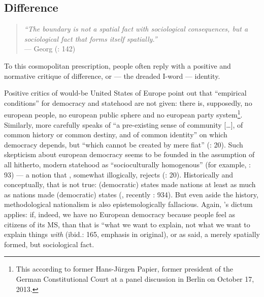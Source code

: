 \subsection[Difference]{Difference} \label{sec:ID-Difference}

\begin{quote}
	\emph{``The boundary is not a spatial fact with sociological consequences, but a sociological fact that forms itself spatially.''} \\
	--- Georg \citeauthor{Simmel1903} (\citeyear{Simmel1903}: 142)
\end{quote}

To this cosmopolitan prescription, people often reply with a positive and normative critique of difference, or --- the dreaded I-word --- identity.

Positive critics of would-be United States of Europe point out that ``empirical conditions'' for democracy and statehood are not given: there is, supposedly, no european people, no european public sphere and no european party system\footnote{
	This according to former Hans-J\"{u}rgen Papier, former president of the German Constitutional Court at a panel discussion in Berlin on October 17, 2013.}.
Similarly, \citeauthor{Scharpf1997} more carefully 	speaks of ``a pre-existing sense of community [\ldots], of common history or common destiny, and of common identity'' on which democracy depends, but ``which cannot be created by mere fiat'' (\citeyear{Scharpf1997}: 20).
Such skepticism about european democracy seems to be founded in the assumption of all hitherto, modern statehood as ``socioculturally homogenous'' (for example, \citealt{BeckGrande-2007-aa}: 93) --- a notion that \citeauthor{Scharpf1997}, somewhat illogically, rejects (\citeyear{Scharpf1997}: 20). Historically and conceptually, that is not true: (democratic) states made nations at least as much as nations made (democratic) states (\citealt{Gellner-1983-aa}, recently \citealt{Schmitter1999}: 934). But even aside the history, methodological nationalism is also epistemologically fallacious. Again, \citeauthor{Brubaker-2002-aa}'s dictum applies: if, indeed, we have no European democracy because people feel as citizens of its \gls{MS}, than that is ``what we want to explain, not what we want to explain things \emph{with} (ibid.: 165, emphasis in original), or as \citeauthor{Simmel1903} said, a merely spatially formed, but sociological fact.

